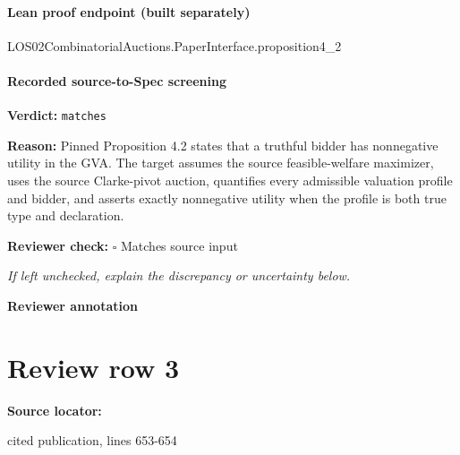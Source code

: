 \documentclass[10pt]{article}
\newcommand{\reviewerbox}{%
  \par\noindent\fbox{\parbox{0.96\linewidth}{\rule{0pt}{0.38in}}}\par
}
\newcommand{\reviewmatch}[1]{%
  \par\noindent\textbf{Reviewer check:} $\square$\; #1\par
  \noindent\emph{If left unchecked, explain the discrepancy or uncertainty below.}\par
}
\begin{document}
\paragraph{Lean proof endpoint (built separately)}\begin{ReviewVerbatim}
LOS02CombinatorialAuctions.PaperInterface.proposition4_2
\end{ReviewVerbatim}

\paragraph{Recorded source-to-Spec screening}
\textbf{Verdict:} \texttt{matches}
\\
{\raggedright
\textbf{Reason:} Pinned Proposition 4.\allowbreak{}2 states that a truthful bidder has nonnegative utility in the GVA.\allowbreak{} The target assumes the source feasible-\allowbreak{}welfare maximizer, uses the source Clarke-\allowbreak{}pivot auction, quantifies every admissible valuation profile and bidder, and asserts exactly nonnegative utility when the profile is both true type and declaration.\allowbreak{}
\par}
\reviewmatch{Matches source input}
\noindent\textbf{Reviewer annotation}\par
\reviewerbox
\clearpage
\hypertarget{source-claim-8905add1866c3e3a}{}
\section*{Review row 3}
\textbf{Source locator:} {\footnotesize\raggedright cited publication, lines 653-\allowbreak{}654\par}
\end{document}

